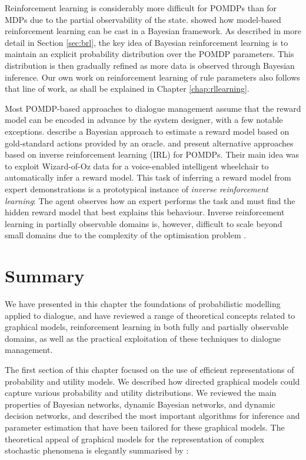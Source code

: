 Reinforcement learning is considerably more difficult for POMDPs than for MDPs due to the partial observability of the state.  \cite{5946754} showed how model-based reinforcement learning can be cast in a Bayesian framework. As described in more detail in Section \ref{sec:brl}, the key idea of Bayesian reinforcement learning is to maintain an explicit probability distribution over the POMDP parameters. This distribution is then gradually refined as more data is observed through Bayesian inference. Our own work on reinforcement learning of rule parameters also follows that line of work, as shall be explained in Chapter \ref{chap:rllearning}. 

Most POMDP-based approaches to dialogue management assume that the reward model can be encoded in advance by the system designer, with a few notable exceptions. \cite{DBLP:conf/iui/AtrashP09} describe a Bayesian approach to estimate a reward model based on gold-standard actions provided by an oracle. \cite{boularias2010} and \cite{ChinaeiC12} present alternative approaches based on inverse reinforcement learning (IRL) for POMDPs. Their main idea was to exploit Wizard-of-Oz data for a voice-enabled intelligent wheelchair to automatically infer a reward model.  This task of inferring a reward model from expert demonstrations is a prototypical instance of \textit{inverse reinforcement learning}: The agent observes how an expert performs the task and must find the hidden reward model that best explains this behaviour.  Inverse reinforcement learning in partially observable domains is, however, difficult to scale beyond small domains due to the complexity of the optimisation problem \citep{Choi:2011}. 

\section{Summary}

We have presented in this chapter the foundations of probabilistic modelling applied to dialogue, and have reviewed a range of theoretical concepts related to graphical models, reinforcement learning in both fully and partially observable domains, as well as the practical exploitation of these techniques to dialogue management. 

The first section of this chapter focused on the use of efficient representations of probability and utility models.  We described how directed graphical models could capture various probability and utility distributions. We reviewed the main properties of Bayesian networks, dynamic Bayesian networks, and dynamic decision networks, and described the most important algorithms for inference and parameter estimation that have been tailored for these graphical models. The theoretical appeal of graphical models for the representation of complex stochastic phenomena is elegantly summarised by \citet[][p.~1]{jordan1998}: 

